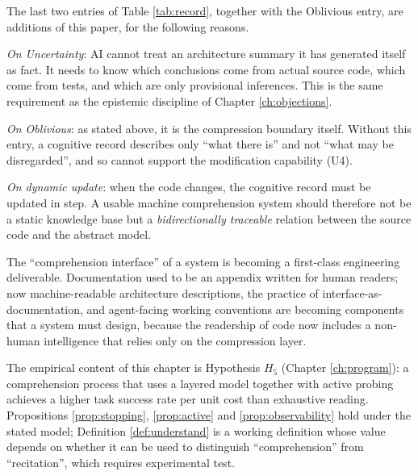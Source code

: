 The last two entries of Table \ref{tab:record}, together with the Oblivious entry, are
additions of this paper, for the following reasons.

\emph{On Uncertainty}: AI cannot treat an architecture summary it has generated itself as
fact. It needs to know which conclusions come from actual source code, which come from tests,
and which are only provisional inferences. This is the same requirement as the epistemic
discipline of Chapter \ref{ch:objections}.

\emph{On Oblivious}: as stated above, it is the compression boundary itself. Without this
entry, a cognitive record describes only ``what there is'' and not ``what may be
disregarded'', and so cannot support the modification capability (U4).

\emph{On dynamic update}: when the code changes, the cognitive record must be updated in step.
A usable machine comprehension system should therefore not be a static knowledge base but a
\emph{bidirectionally traceable} relation between the source code and the abstract model.

\begin{principle}\label{pr:readability}
The ``comprehension interface'' of a system is becoming a first-class engineering deliverable.
Documentation used to be an appendix written for human readers; now machine-readable
architecture descriptions, the practice of interface-as-documentation, and agent-facing
working conventions are becoming components that a system must design, because the readership
of code now includes a non-human intelligence that relies only on the compression layer.
\end{principle}

The empirical content of this chapter is Hypothesis $H_5$ (Chapter \ref{ch:program}): a
comprehension process that uses a layered model together with active probing achieves a higher
task success rate per unit cost than exhaustive reading. Propositions \ref{prop:stopping},
\ref{prop:active} and \ref{prop:observability} hold under the stated model; Definition
\ref{def:understand} is a working definition whose value depends on whether it can be used to
distinguish ``comprehension'' from ``recitation'', which requires experimental test.
